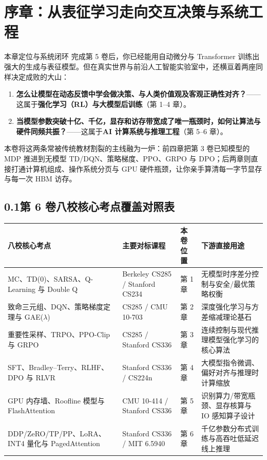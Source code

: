 \chapter*{序章：从表征学习走向交互决策与系统工程}


\begin{chapIntro}{本章定位与系统闭环}
完成第 5 卷后，你已经能用自动微分与 Transformer 训练出强大的生成与表征模型。但在真实世界与前沿人工智能实验室中，还横亘着两座同样决定成败的大山：
\begin{enumerate}
  \item \textbf{怎么让模型在动态反馈中学会做决策、与人类价值观及客观正确性对齐？}——这属于\textbf{强化学习（RL）与大模型后训练}（第 1--4 章）。
  \item \textbf{当模型参数突破十亿、千亿，显存和访存带宽成了唯一瓶颈时，如何让算法与硬件同频共振？}——这属于\textbf{AI 计算系统与推理工程}（第 5--6 章）。
\end{enumerate}
本卷将这两条常被传统教材割裂的主线融为一炉：前四章把第 3 卷已知模型的 MDP 推进到无模型 TD/DQN、策略梯度、PPO、GRPO 与 DPO；后两章则直接打通计算机组成、操作系统分页与 GPU 硬件瓶颈，让你亲手算清每一字节显存与每一次 HBM 访存。
\end{chapIntro}

\section*{0.1\quad 第 6 卷八校核心考点覆盖对照表}

\begin{center}
\footnotesize
\begin{tabularx}{\linewidth}{@{}p{35mm}p{35mm}p{15mm}X@{}}
\toprule
\textbf{八校核心考点} & \textbf{主要对标课程} & \textbf{本卷位置} & \textbf{下游直接用途} \\
\midrule
MC、TD(0)、SARSA、Q-Learning 与 Double Q & Berkeley CS285 / Stanford CS234 & 第 1 章 & 无模型时序差分控制与安全/最优策略权衡 \\
致命三元组、DQN、策略梯度定理与 GAE($\lambda$) & CS285 / CMU 10-703 & 第 2 章 & 深度强化学习与方差缩减理论基石 \\
重要性采样、TRPO、PPO-Clip 与 GRPO & CS285 / Stanford CS336 & 第 3 章 & 连续控制与现代推理模型强化学习的核心算法 \\
SFT、Bradley--Terry、RLHF、DPO 与 RLVR & Stanford CS336 / CS224n & 第 4 章 & 大模型指令微调、偏好对齐与推理时计算缩放 \\
GPU 内存墙、Roofline 模型与 FlashAttention & CMU 10-414 / Stanford CS336 & 第 5 章 & 识别算力/带宽瓶颈、显存核算与 IO 感知算子设计 \\
DDP/ZeRO/TP/PP、LoRA、INT4 量化与 PagedAttention & Stanford CS336 / MIT 6.5940 & 第 6 章 & 千亿参数分布式训练与高吞吐低延迟线上推理 \\
\bottomrule
\end{tabularx}
\end{center}

